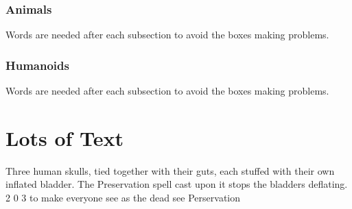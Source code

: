 \documentclass[a4paper,openany]{book}
\begin{document}
\begin{multicols}{2}

\subsection{Animals}
Words are needed after each subsection to avoid the boxes making problems.

\morphhorse

\morphcat

\morphslug

\morphspider

\morphwolf

\subsection{Humanoids}
Words are needed after each subsection to avoid the boxes making problems.



\goblin

\goblincaster

\hobgoblin

\ogre

\end{multicols}


\chapter{Lots of Text}

\begin{multicols}{2}

\noindent
\lipsum

  {Three human skulls, tied together with their guts, each stuffed with their own inflated bladder.
  The Preservation spell cast upon it stops the bladders deflating.}%
  {2}%
  {0}%
  {3}%
  {to make everyone see as the dead see}%
  {Perservation}%
  {
    \setcounter{Vigilance}{1}
    \setcounter{Fate}{2}
    \setcounter{Air}{2}
    \setcounter{Water}{1}
  }%

\end{multicols}
\end{document}
